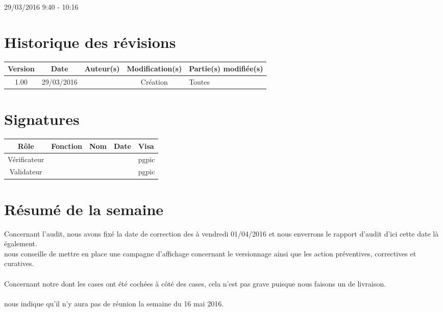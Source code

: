 \documentclass [a4paper] {article}
\begin{document}
\rhead{}

29/03/2016
\hfill   
\hfill 	9:40 - 10:16 				%



\section*{Historique des révisions}
\begin{center}
			\begin{tabular}{| c | c | c | c | p{4cm} |}
				\hline
				\rowcolor{Gray}
				Version & Date & Auteur(s) & Modification(s) & Partie(s) modifiée(s)		 \\
				\hline
				1.00 & 29/03/2016 & \Pierre & Création & Toutes \\
		\hline		
			\end{tabular}
		\end{center}

\section*{Signatures}

		\begin{center}
			\begin{tabular}{| c | c | c | c | p{4cm} |}
				\hline
				\rowcolor{Gray}
				Rôle & Fonction & Nom & Date & Visa		 \\
				\hline
				Vérificateur & \RQA & \Kafui &  & pgpic \\[30pt]
				\hline
				Validateur & \CP & \Sergi &  & pgpic \\[30pt]	
				\hline
			\end{tabular}
		\end{center}


\section{Résumé de la semaine}

Concernant l'audit, nous avons fixé la date de correction des \FT{} à vendredi 01/04/2016 et nous enverrons le rapport d'audit d'ici cette date là également. \\
\nomTuteurQualite{} nous conseille de mettre en place une campagne d'affichage concernant le versionnage ainsi que les action préventives, correctives et curatives. \\ ~ \\

Concernant notre \CDR{} dont les cases ont été cochées à côté des cases, cela n'est pas grave puisque nous faisons un \PV{} de livraison. \\ ~ \\

\nomTuteurQualite{} nous indique qu'il n'y aura pas de réunion la semaine du 16 mai 2016.
\end{document}

